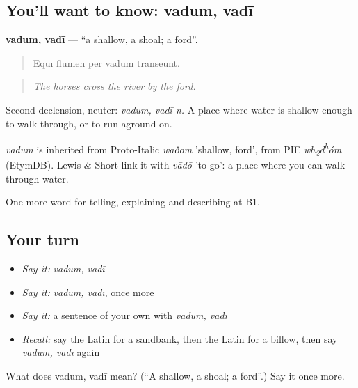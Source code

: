 \subsection*{You'll want to know: vadum, vadī}
\textbf{vadum, vadī} — \textquotedblleft{}a shallow, a shoal; a ford\textquotedblright{}.

\begin{quote}
Equī flūmen per vadum trānseunt.
\end{quote}

\begin{quote}
\emph{The horses cross the river by the ford.}
\end{quote}

Second declension, neuter: \emph{vadum, vadī n.} A place where water is shallow enough to walk through, or to run aground on.

\begin{cousinweb}
\emph{vadum} is inherited from Proto-Italic \emph{waðom} 'shallow, ford', from PIE \emph{wh\textsubscript{2}d\textsuperscript{h}óm} (EtymDB). Lewis \& Short link it with \emph{vādō} 'to go': a place where you can walk through water.
\end{cousinweb}

\begin{grammarlens}[title={What you've built}]
One more word for telling, explaining and describing at B1.
\end{grammarlens}

\subsection*{Your turn}
\begin{itemize}
\raggedright
  \item \emph{Say it:} \emph{vadum, vadī}
  \item \emph{Say it:} \emph{vadum, vadī}, once more
  \item \emph{Say it:} a sentence of your own with \emph{vadum, vadī}
  \item \emph{Recall:} say the Latin for a sandbank, then the Latin for a billow, then say \emph{vadum, vadī} again
\end{itemize}

\begin{tcolorbox}[breakable,colback=teal!4,colframe=teal!35!black,title={Before you move on}]
What does vadum, vadī mean? (\textquotedblleft{}A shallow, a shoal; a ford\textquotedblright{}.) Say it once more.
\end{tcolorbox}
